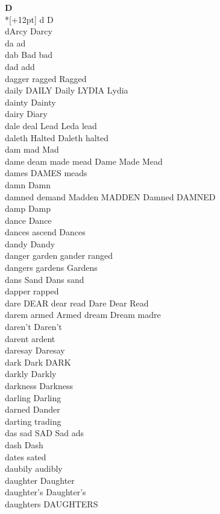 \vspace{14pt}
\noindent\textbf{\Large D}\\*[+12pt]
d D\\
dArcy Darcy\\
da ad\\
dab Bad bad\\
dad add\\
dagger ragged Ragged\\
daily DAILY Daily LYDIA Lydia\\
dainty Dainty\\
dairy Diary\\
dale deal Lead Leda lead\\
daleth Halted Daleth halted\\
dam mad Mad\\
dame deam made mead Dame Made Mead\\
dames DAMES meads\\
damn Damn\\
damned demand Madden MADDEN Damned DAMNED\\
damp Damp\\
dance Dance\\
dances ascend Dances\\
dandy Dandy\\
danger garden gander ranged\\
dangers gardens Gardens\\
dans Sand Dans sand\\
dapper rapped\\
dare DEAR dear read Dare Dear Read\\
darem armed Armed dream Dream madre\\
daren't Daren't\\
darent ardent\\
daresay Daresay\\
dark Dark DARK\\
darkly Darkly\\
darkness Darkness\\
darling Darling\\
darned Dander\\
darting trading\\
das sad SAD Sad ads\\
dash Dash\\
dates sated\\
daubily audibly\\
daughter Daughter\\
daughter's Daughter's\\
daughters DAUGHTERS\\
